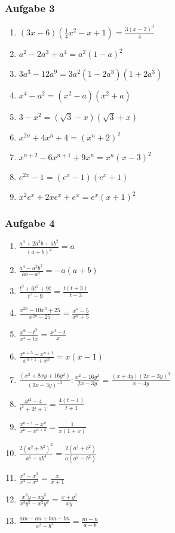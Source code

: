 \subsubsection{Aufgabe 3}
\begin{enumerate}
	\item \quad $ (3x-6)\left(\frac{1}{4}x^2 - x + 1\right)=\frac{3(x-2)^3}{4} $			%
	\item \quad $ a^2 - 2a^3 + a^4=a^2(1-a)^2 $							%
	\item \quad $  3a^3 - 12a^9=3a^2(1-2a^3)(1+2a^3) $		%
	\item \quad $ x^4 - a^2 =(x^2-a)(x^2+a) $					%
	\item \quad $ 3-x^2 =(\sqrt{3}-x)(\sqrt{3}+x) $%
	\item \quad $ x^{2n} + 4x^n + 4 =(x^n + 2)^2 $							%
	\item \quad $ x^{n+2} -6x^{n+1} + 9x^n =x^n(x-3)^2 $							%
	\item \quad $ e^{2x}-1 =(e^x-1)(e^x+1) $					%
	\item \quad $ x^2e^x + 2xe^x +e^x =e^x(x+1)^2 $							%
\end{enumerate}

\subsubsection{Aufgabe 4} 
\begin{enumerate}
	\item \quad $ \frac{a^3+2a^2b+ab^2}{(a+b)^2} =a $															%
	\item \quad $ \frac{a^4-a^2b^2}{ab-a^2}=-a(a+b) $												%
	\item \quad $ \frac{t^3+6t^2+9t}{t^2-9} =\frac{t(t+3)}{t-3} $						%
	\item \quad $ \frac{x^{2n}-10x^n+25}{x^{2n}-25}=\frac{x^n-5}{x^n+5} $						%
	\item \quad $ \frac{x^6-t^2}{x^4+tx} =\frac{x^3-t}{x} $								%
	\item \quad $ \frac{x^{n+3}-x^{n+1}}{x^{n+1}+x^n}=x(x-1) $												%
	\item \quad $ \frac{(x^2+8xy+16y^2)}{(2x-3y)^{-2}} : \frac{x^2-16y^2}{2x-3y}=\frac{(x+4y)(2x-3y)^3}{x-4y} $	%
	\item \quad $ \frac{4t^2-4}{t^2+2t+1} =\frac{4(t-1)}{t+1} $						%
	\item \quad $ \frac{x^{n-1}-x^n}{x^n-x^{n+2}}=\frac{1}{x(1+x)} $							%
	\item \quad $ \frac{2(a^2+b^2)^2}{a^5-ab^4}=\frac{2(a^2+b^2)}{a(a^2-b^2)} $	%
	\item \quad $ \frac{x^4-x^3}{x^4-x^2} =\frac{x}{x+1} $									%
	\item \quad $ \frac{x^3y-xy^5}{x^3y^2-x^2y^4}=\frac{x+y^2}{xy} $							%
	\item \quad $ \frac{am-an+bm-bn}{a^2-b^2} =\frac{m-n}{a-b} $								%
\end{enumerate}

